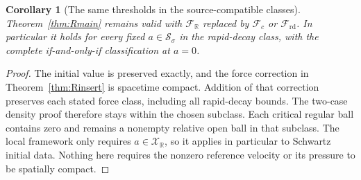\documentclass[11pt,a4paper]{article}
\newtheorem{corollary}[theorem]{Corollary}
\theoremstyle{definition}\newtheorem{definition}[theorem]{Definition}
\theoremstyle{remark}\newtheorem{remark}[theorem]{Remark}
\newcommand{\R}{\mathbb R}\newcommand{\TT}{\mathbb T^3}
\begin{document}
\begin{corollary}[The same thresholds in the source-compatible classes]\label{cor:Rclasses}
Theorem~\ref{thm:Rmain} remains valid with $\mathcal F_{\R}$ replaced by $\mathcal F_c$ or $\mathcal F_{\mathrm{rd}}$. In particular it holds for every fixed $a\in\mathcal S_\sigma$ in the rapid-decay class, with the complete if-and-only-if classification at $a=0$.
\end{corollary}
\begin{proof}
The initial value is preserved exactly, and the force correction in Theorem~\ref{thm:Rinsert} is spacetime compact. Addition of that correction preserves each stated force class, including all rapid-decay bounds. The two-case density proof therefore stays within the chosen subclass. Each critical regular ball contains zero and remains a nonempty relative open ball in that subclass. The local framework only requires $a\in\mathcal X_{\R}$, so it applies in particular to Schwartz initial data. Nothing here requires the nonzero reference velocity or its pressure to be spatially compact.
\end{proof}
\end{document}
